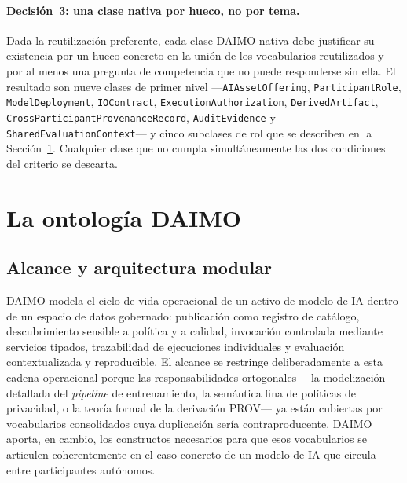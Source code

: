 \documentclass[11pt,a4paper]{article}
\newcommand{\code}[1]{\texttt{#1}}
\begin{document}
\paragraph{Decisión~3: una clase nativa por hueco, no por tema.} Dada la reutilización preferente, cada clase DAIMO-nativa debe justificar su existencia por un hueco concreto en la unión de los vocabularios reutilizados y por al menos una pregunta de competencia que no puede responderse sin ella. El resultado son nueve clases de primer nivel ---\code{AIAssetOffering}, \code{ParticipantRole}, \code{ModelDeployment}, \code{IOContract}, \code{ExecutionAuthorization}, \code{DerivedArtifact}, \code{CrossParticipantProvenanceRecord}, \code{AuditEvidence} y \code{SharedEvaluationContext}--- y cinco subclases de rol que se describen en la Sección~\ref{sec:ontology}. Cualquier clase que no cumpla simultáneamente las dos condiciones del criterio se descarta.

\section{La ontología DAIMO}\label{sec:ontology}

\subsection{Alcance y arquitectura modular}

DAIMO modela el ciclo de vida operacional de un activo de modelo de IA dentro de un espacio de datos gobernado: publicación como registro de catálogo, descubrimiento sensible a política y a calidad, invocación controlada mediante servicios tipados, trazabilidad de ejecuciones individuales y evaluación contextualizada y reproducible. El alcance se restringe deliberadamente a esta cadena operacional porque las responsabilidades ortogonales ---la modelización detallada del \emph{pipeline} de entrenamiento, la semántica fina de políticas de privacidad, o la teoría formal de la derivación PROV--- ya están cubiertas por vocabularios consolidados cuya duplicación sería contraproducente. DAIMO aporta, en cambio, los constructos necesarios para que esos vocabularios se articulen coherentemente en el caso concreto de un modelo de IA que circula entre participantes autónomos.
\end{document}
